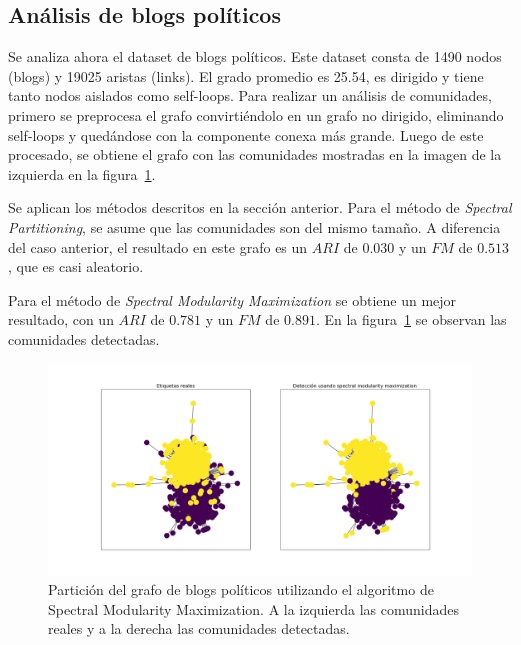 \documentclass{article}
\begin{document}
\subsection{Análisis de blogs políticos}


Se analiza ahora el dataset de blogs políticos. Este dataset consta de 1490 nodos (blogs) y 19025 aristas (links). El grado promedio es 25.54, es dirigido y tiene tanto nodos aislados como self-loops. Para realizar un análisis de comunidades, primero se preprocesa el grafo convirtiéndolo en un grafo no dirigido, eliminando self-loops y quedándose con la componente conexa más grande. Luego de este procesado, se obtiene el grafo con las comunidades mostradas en la imagen de la izquierda en la figura~\ref{fig: blogs_politicos_spectral_modularity_maximization}.


Se aplican los métodos descritos en la sección anterior. Para el método de \emph{Spectral Partitioning}, se asume que las comunidades son del mismo tamaño. A diferencia del caso anterior, el resultado en este grafo es un $ARI$ de $0.030$ y un $FM$ de $0.513$, que es casi aleatorio.


Para el método de \emph{Spectral Modularity Maximization} se obtiene un mejor resultado, con un $ARI$ de $0.781$ y un $FM$ de $0.891$. En la figura~\ref{fig: blogs_politicos_spectral_modularity_maximization} se observan las comunidades detectadas.

\begin{figure}[htb]
    \centering
    \includegraphics[width=\textwidth]{imagenes/blogs_politicos_spectral_modularity_maximization.png}
    \caption{Partición del grafo de blogs políticos utilizando el algoritmo de Spectral Modularity Maximization. A la izquierda las comunidades reales y a la derecha las comunidades detectadas.}
    \label{fig: blogs_politicos_spectral_modularity_maximization}
\end{figure}
\end{document}
